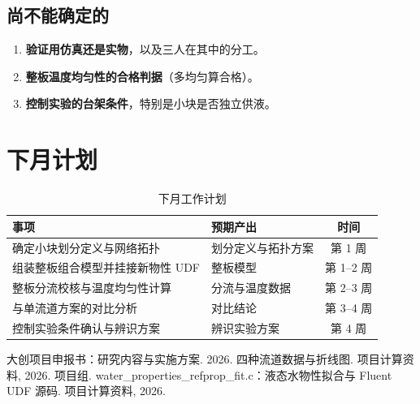 \documentclass[stage2,fontset=fandol]{ydzjreport}
\begin{document}
\subsection{尚不能确定的}

\begin{enumerate}
  \item \textbf{验证用仿真还是实物}，以及三人在其中的分工。
  \item \textbf{整板温度均匀性的合格判据}（多均匀算合格）。
  \item \textbf{控制实验的台架条件}，特别是小块是否独立供液。
\end{enumerate}

\section{下月计划}

\begin{table}[H]
\centering
\caption{下月工作计划}
\label{tab:plan}
\begin{tabularx}{\textwidth}{@{}Y Y c@{}}
\toprule
{} 事项 & 预期产出 & 时间 \\
\midrule
确定小块划分定义与网络拓扑 & 划分定义与拓扑方案 & 第 1 周 \\
组装整板组合模型并挂接新物性 UDF & 整板模型 & 第 1--2 周 \\
整板分流校核与温度均匀性计算 & 分流与温度数据 & 第 2--3 周 \\
与单流道方案的对比分析 & 对比结论 & 第 3--4 周 \\
控制实验条件确认与辨识方案 & 辨识实验方案 & 第 4 周 \\
\bottomrule
\end{tabularx}
\end{table}

\begin{thebibliography}{9}
 大创项目申报书：研究内容与实施方案. 2026.
 四种流道数据与折线图. 项目计算资料, 2026.
 项目组. water\_properties\_refprop\_fit.c：液态水物性拟合与 Fluent UDF 源码. 项目计算资料, 2026.
\end{thebibliography}
\end{document}

